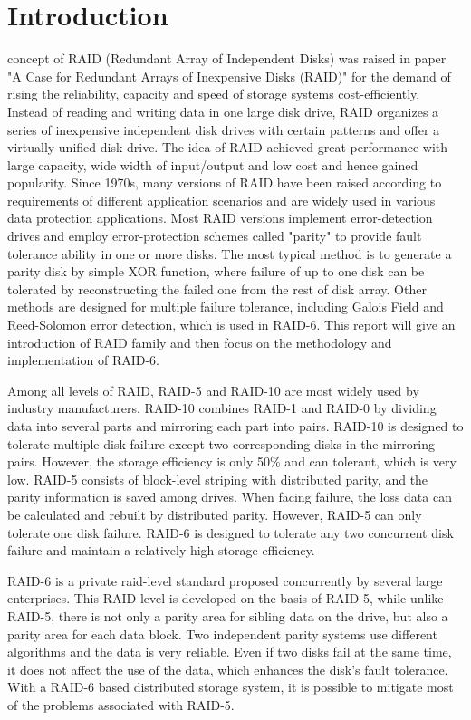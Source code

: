 \documentclass[journal]{IEEEtran}
\begin{document}
\section{Introduction}
 concept of RAID (Redundant Array of Independent Disks) was raised in  paper "A Case for Redundant Arrays of Inexpensive Disks (RAID)"\cite{IEEEhowto:kopka} for the demand of rising the reliability, capacity and speed of storage systems cost-efficiently. Instead of reading and writing data in one large disk drive, RAID organizes a series of inexpensive independent disk drives with certain patterns and offer a virtually unified disk drive. The idea of RAID achieved great performance with large capacity, wide width of input/output and low cost and hence gained popularity. Since 1970s, many versions of RAID have been raised according to requirements of different application scenarios and are widely used in various data protection applications. Most RAID versions implement error-detection drives and employ error-protection schemes called "parity" to provide fault tolerance ability in one or more disks. The most typical method is to generate a parity disk by simple XOR function, where failure of up to one disk can be tolerated by reconstructing the failed one from the rest of disk array. Other methods are designed for multiple failure tolerance, including Galois Field and Reed-Solomon error detection, which is used in RAID-6. This report will give an introduction of RAID family and then focus on the methodology and implementation of RAID-6.

Among all levels of RAID, RAID-5 and RAID-10 are most widely used by industry manufacturers. RAID-10 combines RAID-1 and RAID-0 by dividing data into several parts and mirroring each part into pairs. RAID-10 is designed to tolerate multiple disk failure except two corresponding disks in the mirroring pairs. However, the storage efficiency is only 50\% and can tolerant, which is very low. RAID-5 consists of block-level striping with distributed parity, and the parity information is saved among drives. When facing failure, the loss data can be calculated and rebuilt by distributed parity. However, RAID-5 can only tolerate one disk failure. RAID-6 is designed to tolerate any two concurrent disk failure and maintain a relatively high storage efficiency.

RAID-6 is a private raid-level standard proposed concurrently by several large enterprises. This RAID level is developed on the basis of RAID-5, while unlike RAID-5, there is not only a parity area for sibling data on the drive, but also a parity area for each data block. Two independent parity systems use different algorithms and the data is very reliable. Even if two disks fail at the same time, it does not affect the use of the data, which enhances the disk’s fault tolerance. With a RAID-6 based distributed storage system, it is possible to mitigate most of the problems associated with RAID-5.
\end{document}
